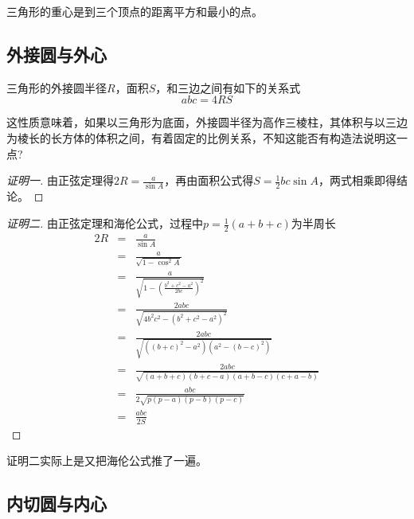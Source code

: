 \begin{inference}
  三角形的重心是到三个顶点的距离平方和最小的点。
\end{inference}

\subsection{外接圆与外心}
\label{sec:triangle-excenter}

\begin{property}
  \label{ppty:triangle-circumradius-area-sides}
  三角形的外接圆半径$R$，面积$S$，和三边之间有如下的关系式
  \begin{equation}
    \label{eq:triangle-circumradius-area-sides}
    abc = 4RS
  \end{equation}
\end{property}

这性质意味着，如果以三角形为底面，外接圆半径为高作三棱柱，其体积与以三边为棱长的长方体的体积之间，有着固定的比例关系，不知这能否有构造法说明这一点?

\begin{proof}[证明一]
  由正弦定理得$2R=\frac{a}{\sin{A}}$，再由面积公式得$S=\frac{1}{2}bc\sin{A}$，两式相乘即得结论。
\end{proof}

\begin{proof}[证明二]
  由正弦定理和海伦公式，过程中$p=\frac{1}{2}(a+b+c)$为半周长
  \begin{eqnarray*}
    2R & = & \frac{a}{\sin{A}} \\
       & = & \frac{a}{\sqrt{1-\cos^2{A}}} \\
       & = & \frac{a}{\sqrt{1-\left( \frac{b^2+c^2-a^2}{2bc} \right)^2}} \\
       & = & \frac{2abc}{\sqrt{4b^2c^2-(b^2+c^2-a^2)^2}} \\
       & = & \frac{2abc}{\sqrt{((b+c)^2-a^2)(a^2-(b-c)^2)}} \\
       & = & \frac{2abc}{\sqrt{(a+b+c)(b+c-a)(a+b-c)(c+a-b)}} \\
       & = & \frac{abc}{2 \sqrt{p(p-a)(p-b)(p-c)}} \\
    & = & \frac{abc}{2S}
  \end{eqnarray*}
\end{proof}
证明二实际上是又把海伦公式推了一遍。


\subsection{内切圆与内心}
\label{sec:triangle-incenter}

